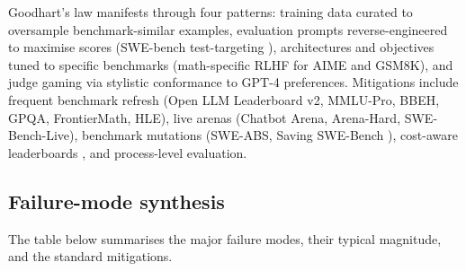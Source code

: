 \documentclass{article}
\begin{document}
Goodhart's law manifests through four patterns: training data curated to oversample benchmark-similar examples, evaluation prompts reverse-engineered to maximise scores (SWE-bench test-targeting \cite{yu20262026}), architectures and objectives tuned to specific benchmarks (math-specific RLHF for AIME and GSM8K), and judge gaming via stylistic conformance to GPT-4 preferences. Mitigations include frequent benchmark refresh (Open LLM Leaderboard v2, MMLU-Pro, BBEH, GPQA, FrontierMath, HLE), live arenas (Chatbot Arena, Arena-Hard, SWE-Bench-Live), benchmark mutations (SWE-ABS, Saving SWE-Bench \cite{garg2025savingswebenchaben}), cost-aware leaderboards \cite{kapoor20242024}, and process-level evaluation.

\subsection{Failure-mode synthesis}\label{failure-mode-synthesis}

The table below summarises the major failure modes, their typical magnitude, and the standard mitigations.
\end{document}
